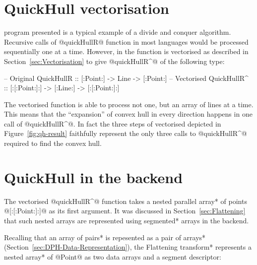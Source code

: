 \documentclass[preamble.tex]{subfiles}
\begin{document}
\section{QuickHull vectorisation}

\QuickHull program presented is a typical example of a divide and conquer algorithm. Recursive calls of @quickHullR@ function in most languages would be processed sequentially one at a time. However, in \DPH the function is vectorised as described in Section~\ref{sec:Vectorisation} to give @quickHullR^@ of the following type:


\begin{hscode}[literate={^}{{$^\uparrow$}}1,]
-- Original
QuickHullR  :: [:Point:] -> Line -> [:Point:]
-- Vectorised
QuickHullR^ :: [:[:Point:]:] -> [:Line:] -> [:[:Point:]:]
\end{hscode}


The vectorised function is able to process not one, but an array of lines at a time. This means that the ``expansion'' of convex hull in every direction happens in one call of @quickHullR^@. In fact the three steps of vectorised \QuickHull depicted in Figure~\ref{fig:qh-result} faithfully represent the only three calls to @quickHullR^@ required to find the convex hull.



\section{QuickHull in the backend}

The vectorised @quickHullR^@ function takes a \*nested parallel array* of points @[:[:Point:]:]@ as its first argument. It was discussed in Section~\ref{sec:Flattening} that such nested arrays are represented using \*segmented* arrays in the backend.

Recalling that an \*array of pairs* is repesented as a \*pair of arrays* (Section~\ref{sec:DPH-Data-Representation}), the \*Flattening transform* represents a \*nested array* of @Point@ as two data arrays and a segment descriptor:


\newlength\fixedcharwidth
{}
\newcommand\seg[1]{\rule{#1\fixedcharwidth}{1pt}}

\end{document}

